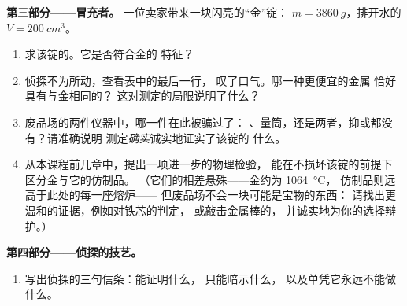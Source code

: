 \begin{problem}
\medskip\noindent\textbf{第三部分——冒充者。}
一位卖家带来一块闪亮的“金”锭：
$m = \qty{3860}{g}$，排开水的 $V = \qty{200}{cm^3}$。
\begin{enumerate}[resume]
  \item 求该锭的。它是否符合金的
        特征？
  \item 侦探不为所动，查看表中的最后一行，
        叹了口气。哪一种更便宜的金属
        恰好具有与金相同的？
        这对测定的局限说明了什么？
  \item 废品场的两件仪器中，哪一件在此被骗过了：
        、量筒，还是两者，抑或都没有？请准确说明
        测定\emph{确实}诚实地证实了该锭的
        什么。
  \item 从本课程前几章中，提出一项进一步的物理检验，
        能在不损坏该锭的前提下区分金与它的仿制品。
        （它们的相差悬殊——金约为 \qty{1064}{\celsius}，
        仿制品则远高于此处的每一座熔炉——
        但废品场不会一块可能是宝物的东西：
        请找出更温和的证据，例如对铁芯的判定，
        或敲击金属棒的，
        并诚实地为你的选择辩护。）
\end{enumerate}

\medskip\noindent\textbf{第四部分——侦探的技艺。}
\begin{enumerate}[resume]
  \item 写出侦探的三句信条：能证明什么，
        只能暗示什么，
        以及单凭它永远不能做什么。
\end{enumerate}
\end{problem}
